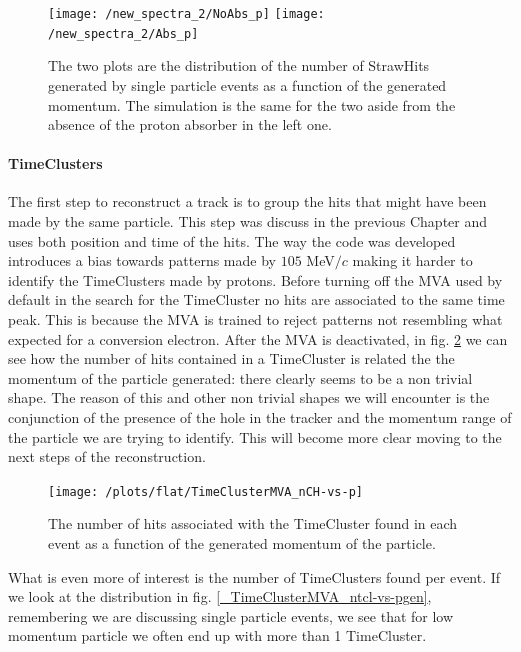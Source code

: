 \documentclass[12pt,a4paper,openright, oneside, titlepage]{book} %
\begin{document}
\begin{figure}[h!]
\centering
\texttt{[image: /new\_spectra\_2/NoAbs\_p]}\hfill
\texttt{[image: /new\_spectra\_2/Abs\_p]}
\caption{The two plots are the distribution of the number of StrawHits generated by single particle events as a function of the generated momentum. The simulation is the same for the two aside from the absence of the proton absorber in the left one.}
\label{_proton_absorber}
\end{figure}


\paragraph{TimeClusters} The first step to reconstruct a track is to group the hits that might have been made by the same particle. This step was discuss in the previous Chapter and uses both position and time of the hits. 
The way the code was developed introduces a bias towards patterns made by $105$ MeV$/c$ making it harder to identify the TimeClusters made by protons. 
Before turning off the MVA used by default in the search for the TimeCluster no hits are associated to the same time peak. This is because the MVA is trained to reject patterns not resembling what expected for a conversion electron. After the MVA is deactivated, in fig. \ref{_flat_TimeClusterMVA_nCH-vs-p} we can see how the number of hits contained in a TimeCluster is related the the momentum of the particle generated: there clearly seems to be a non trivial shape. The reason of this and other non trivial shapes we will encounter is the conjunction of the presence of the hole in the tracker and the momentum range of the particle we are trying to identify. This will become more clear moving to the next steps of the reconstruction.\\

\begin{figure}[h!]
\centering
\texttt{[image: /plots/flat/TimeClusterMVA\_nCH-vs-p]}
\caption{The number of hits associated with the TimeCluster found in each event as a function of the generated momentum of the particle.}
\label{_flat_TimeClusterMVA_nCH-vs-p}
\end{figure}

\noindent What is even more of interest is the number of TimeClusters found per event. If we look at the distribution in fig. \ref{_TimeClusterMVA_ntcl-vs-pgen}, remembering we are discussing single particle events, we see that for low momentum particle we often end up with more than 1 TimeCluster.\\
\end{document}
